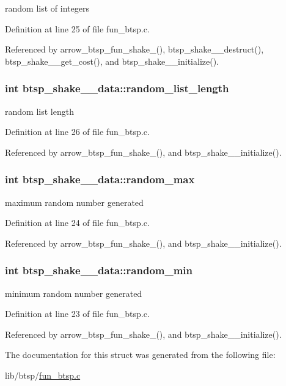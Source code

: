random list of integers 

Definition at line 25 of file fun\_\-btsp.c.

Referenced by arrow\_\-btsp\_\-fun\_\-shake\_(), btsp\_\-shake\_\_\-destruct(), btsp\_\-shake\_\_\-get\_\-cost(), and btsp\_\-shake\_\_\-initialize().\hypertarget{structbtsp__shake__1__data_ef9f8c49e26ffcd108f67fc035c6e478}{
\subsubsection[{random\_\-list\_\-length}]{\setlength{\rightskip}{0pt plus 5cm}int {\bf btsp\_\-shake\_\_\-data::random\_\-list\_\-length}}}
\label{structbtsp__shake__1__data_ef9f8c49e26ffcd108f67fc035c6e478}


random list length 

Definition at line 26 of file fun\_\-btsp.c.

Referenced by arrow\_\-btsp\_\-fun\_\-shake\_(), and btsp\_\-shake\_\_\-initialize().\hypertarget{structbtsp__shake__1__data_bcc01769d35906588965943e759a7879}{
\subsubsection[{random\_\-max}]{\setlength{\rightskip}{0pt plus 5cm}int {\bf btsp\_\-shake\_\_\-data::random\_\-max}}}
\label{structbtsp__shake__1__data_bcc01769d35906588965943e759a7879}


maximum random number generated 

Definition at line 24 of file fun\_\-btsp.c.

Referenced by arrow\_\-btsp\_\-fun\_\-shake\_(), and btsp\_\-shake\_\_\-initialize().\hypertarget{structbtsp__shake__1__data_5e5d65be36769726fdf5480d280cc6b8}{
\subsubsection[{random\_\-min}]{\setlength{\rightskip}{0pt plus 5cm}int {\bf btsp\_\-shake\_\_\-data::random\_\-min}}}
\label{structbtsp__shake__1__data_5e5d65be36769726fdf5480d280cc6b8}


minimum random number generated 

Definition at line 23 of file fun\_\-btsp.c.

Referenced by arrow\_\-btsp\_\-fun\_\-shake\_(), and btsp\_\-shake\_\_\-initialize().

The documentation for this struct was generated from the following file:\begin{CompactItemize}
\item 
lib/btsp/\hyperlink{fun__btsp_8c}{fun\_\-btsp.c}\end{CompactItemize}
